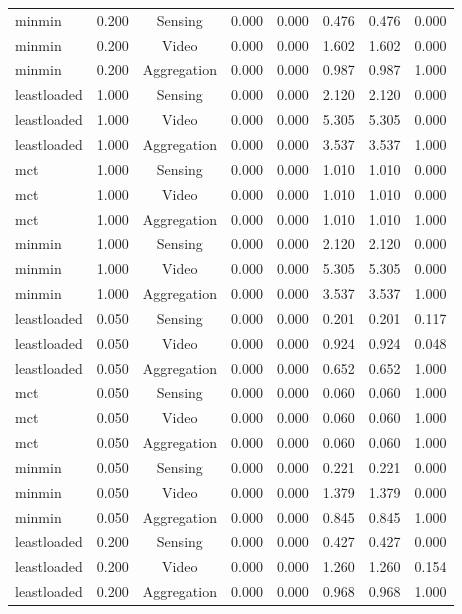 \begin{table}
\begin{tabular}{lccccccc}
minmin & 0.200 & Sensing & 0.000 & 0.000 & 0.476 & 0.476 & 0.000 \\
minmin & 0.200 & Video & 0.000 & 0.000 & 1.602 & 1.602 & 0.000 \\
minmin & 0.200 & Aggregation & 0.000 & 0.000 & 0.987 & 0.987 & 1.000 \\
leastloaded & 1.000 & Sensing & 0.000 & 0.000 & 2.120 & 2.120 & 0.000 \\
leastloaded & 1.000 & Video & 0.000 & 0.000 & 5.305 & 5.305 & 0.000 \\
leastloaded & 1.000 & Aggregation & 0.000 & 0.000 & 3.537 & 3.537 & 1.000 \\
mct & 1.000 & Sensing & 0.000 & 0.000 & 1.010 & 1.010 & 0.000 \\
mct & 1.000 & Video & 0.000 & 0.000 & 1.010 & 1.010 & 0.000 \\
mct & 1.000 & Aggregation & 0.000 & 0.000 & 1.010 & 1.010 & 1.000 \\
minmin & 1.000 & Sensing & 0.000 & 0.000 & 2.120 & 2.120 & 0.000 \\
minmin & 1.000 & Video & 0.000 & 0.000 & 5.305 & 5.305 & 0.000 \\
minmin & 1.000 & Aggregation & 0.000 & 0.000 & 3.537 & 3.537 & 1.000 \\
leastloaded & 0.050 & Sensing & 0.000 & 0.000 & 0.201 & 0.201 & 0.117 \\
leastloaded & 0.050 & Video & 0.000 & 0.000 & 0.924 & 0.924 & 0.048 \\
leastloaded & 0.050 & Aggregation & 0.000 & 0.000 & 0.652 & 0.652 & 1.000 \\
mct & 0.050 & Sensing & 0.000 & 0.000 & 0.060 & 0.060 & 1.000 \\
mct & 0.050 & Video & 0.000 & 0.000 & 0.060 & 0.060 & 1.000 \\
mct & 0.050 & Aggregation & 0.000 & 0.000 & 0.060 & 0.060 & 1.000 \\
minmin & 0.050 & Sensing & 0.000 & 0.000 & 0.221 & 0.221 & 0.000 \\
minmin & 0.050 & Video & 0.000 & 0.000 & 1.379 & 1.379 & 0.000 \\
minmin & 0.050 & Aggregation & 0.000 & 0.000 & 0.845 & 0.845 & 1.000 \\
leastloaded & 0.200 & Sensing & 0.000 & 0.000 & 0.427 & 0.427 & 0.000 \\
leastloaded & 0.200 & Video & 0.000 & 0.000 & 1.260 & 1.260 & 0.154 \\
leastloaded & 0.200 & Aggregation & 0.000 & 0.000 & 0.968 & 0.968 & 1.000 \\

\end{tabular}
\end{table}
